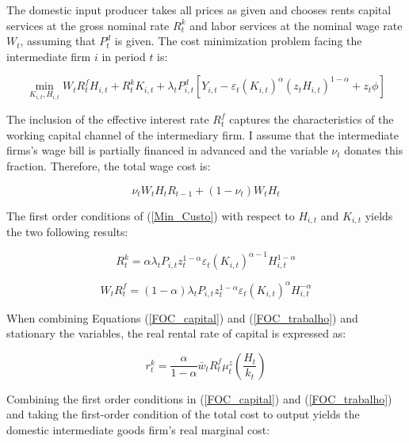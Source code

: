\documentclass[12pt,oneside,a4paper]{article}
\begin{document}
The domestic input producer takes all prices as given and chooses rents capital services at the gross nominal rate $R_t^{k}$ and labor services at the nominal wage rate $W_t$, assuming that $P_t^{d}$ is given. The cost minimization problem facing the intermediate firm $i$ in period $t$ is:

\begin{equation}
\label{Min_Custo}
    \min _{K_{i, t}, H_{i, t}} W_{t}R_t^{f} H_{i, t}+R_{t}^{k} K_{i, t}+\lambda_{t} P_{i, t}^{d}\left[Y_{i, t}-\varepsilon_{t}\left(K_{i, t}\right)^{\alpha}\left(z_{t} H_{i, t}\right)^{1-\alpha}+z_{t} \phi\right]
\end{equation}

The inclusion of the effective interest rate $R_t^{f}$ captures the characteristics of the working capital channel of the intermediary firm. I assume that the intermediate firms's wage bill is partially financed in advanced and the variable $\nu_t$ donates this fraction. Therefore, the total wage cost is:

\begin{equation}
\nu_{t} W_{t} H_{t} R_{t-1}+\left(1-\nu_{t}\right) W_{t} H_{t}
\end{equation}

The first order conditions of (\ref{Min_Custo}) with respect to $H_{i,t}$ and $K_{i,t}$ yields the two following results:

\begin{equation}
\label{FOC_capital}
    R_{t}^{k}=\alpha \lambda_{t} P_{i, t} z_{t}^{1-\alpha} \varepsilon_{t}\left(K_{i, t}\right)^{\alpha-1} H_{i, t}^{1-\alpha}
\end{equation}

\begin{equation}
\label{FOC_trabalho}
    W_{t} R_t^{f}=(1-\alpha) \lambda_{t} P_{i, t} z_{t}^{1-\alpha} \varepsilon_{t}\left(K_{i, t}\right)^{\alpha} H_{i, t}^{-\alpha}
\end{equation}

When combining Equations (\ref{FOC_capital}) and (\ref{FOC_trabalho}) and stationary the variables, the real rental rate of capital is expressed as:

\begin{equation}
    r_{t}^{k}=\frac{\alpha}{1-\alpha} \bar{w}_{t} R_t^{f} \mu_{t}^{z}\left(\frac{H_{t}}{k_{t}}\right)
\end{equation}

Combining the first order conditions in (\ref{FOC_capital}) and (\ref{FOC_trabalho}) and taking the first-order condition of the total cost to output yields the domestic intermediate goods firm's real marginal cost:
\end{document}
